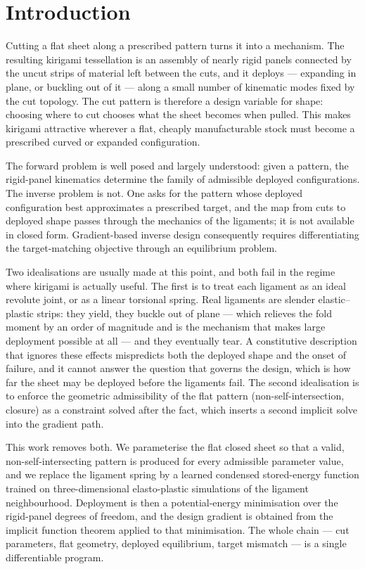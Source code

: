 \documentclass[pdflatex,sn-mathphys-num]{sn-jnl}%
\theoremstyle{thmstyleone}%
\theoremstyle{thmstyletwo}%
\theoremstyle{thmstylethree}%
\begin{document}
\section{Introduction}\label{sec:intro}

Cutting a flat sheet along a prescribed pattern turns it into a mechanism. The
resulting kirigami tessellation is an assembly of nearly rigid panels connected by
the uncut strips of material left between the cuts, and it deploys --- expanding
in plane, or buckling out of it --- along a small number of kinematic modes fixed
by the cut topology. The cut pattern is therefore a design variable for shape:
choosing where to cut chooses what the sheet becomes when pulled. This makes
kirigami attractive wherever a flat, cheaply manufacturable stock must become a
prescribed curved or expanded configuration.

The forward problem is well posed and largely understood: given a pattern, the
rigid-panel kinematics determine the family of admissible deployed
configurations. The inverse problem is not. One asks for the pattern whose
deployed configuration best approximates a prescribed target, and the map from
cuts to deployed shape passes through the mechanics of the ligaments; it is not
available in closed form. Gradient-based inverse design consequently requires
differentiating the target-matching objective through an equilibrium problem.

Two idealisations are usually made at this point, and both fail in the regime
where kirigami is actually useful. The first is to treat each ligament as an ideal
revolute joint, or as a linear torsional spring. Real ligaments are slender
elastic--plastic strips: they yield, they buckle out of plane --- which relieves
the fold moment by an order of magnitude and is the mechanism that makes large
deployment possible at all --- and they eventually tear. A constitutive
description that ignores these effects mispredicts both the deployed shape and the
onset of failure, and it cannot answer the question that governs the design, which
is how far the sheet may be deployed before the ligaments fail. The second
idealisation is to enforce the geometric admissibility of the flat pattern
(non-self-intersection, closure) as a constraint solved after the fact, which
inserts a second implicit solve into the gradient path.

This work removes both. We parameterise the flat closed sheet so that a valid,
non-self-intersecting pattern is produced for every admissible parameter value,
and we replace the ligament spring by a learned condensed stored-energy function
trained on three-dimensional elasto-plastic simulations of the ligament
neighbourhood. Deployment is then a potential-energy minimisation over the
rigid-panel degrees of freedom, and the design gradient is obtained from the
implicit function theorem applied to that minimisation. The whole chain --- cut
parameters, flat geometry, deployed equilibrium, target mismatch --- is a single
differentiable program.
\end{document}
